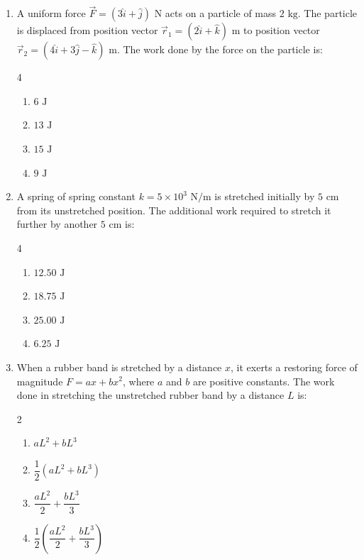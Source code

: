 \documentclass[11pt,a4paper]{article}
\begin{document}
\begin{enumerate}[label=\textbf{\arabic*.},leftmargin=18pt,itemsep=8pt]
  \item A uniform force $\vec{F} = (3\hat{i} + \hat{j})\text{ N}$ acts on a particle of mass $2\text{ kg}$. The particle is displaced from position vector $\vec{r}_1 = (2\hat{i} + \hat{k})\text{ m}$ to position vector $\vec{r}_2 = (4\hat{i} + 3\hat{j} - \hat{k})\text{ m}$. The work done by the force on the particle is:
  \begin{multicols}{4}
    \begin{enumerate}[label=(\Alph*)]
      \item $6\text{ J}$
      \item $13\text{ J}$
      \item $15\text{ J}$
      \item $9\text{ J}$
    \end{enumerate}
  \end{multicols}

  \item A spring of spring constant $k = 5 \times 10^3\text{ N/m}$ is stretched initially by $5\text{ cm}$ from its unstretched position. The additional work required to stretch it further by another $5\text{ cm}$ is:
  \begin{multicols}{4}
    \begin{enumerate}[label=(\Alph*)]
      \item $12.50\text{ J}$
      \item $18.75\text{ J}$
      \item $25.00\text{ J}$
      \item $6.25\text{ J}$
    \end{enumerate}
  \end{multicols}

  \item When a rubber band is stretched by a distance $x$, it exerts a restoring force of magnitude $F = ax + bx^2$, where $a$ and $b$ are positive constants. The work done in stretching the unstretched rubber band by a distance $L$ is:
  \begin{multicols}{2}
    \begin{enumerate}[label=(\Alph*)]
      \item $aL^2 + bL^3$
      \item $\dfrac{1}{2}(aL^2 + bL^3)$
      \item $\dfrac{aL^2}{2} + \dfrac{bL^3}{3}$
      \item $\dfrac{1}{2}\left(\dfrac{aL^2}{2} + \dfrac{bL^3}{3}\right)$
    \end{enumerate}
  \end{multicols}


\end{enumerate}
\end{document}
